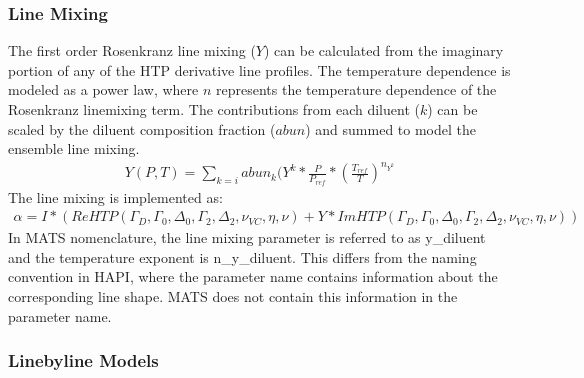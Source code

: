 \documentclass[letterpaper,10pt,english]{sphinxmanual}
\begin{document}
\subsubsection{Line Mixing}
\label{\detokenize{MATS Summary:line-mixing}}
\sphinxAtStartPar
The first order Rosenkranz line mixing (\(Y\)) can be calculated from the imaginary portion of any of the HTP derivative line profiles.  The temperature dependence is modeled as a power law, where \(n\) represents the temperature dependence of the Rosenkranz line\sphinxhyphen{}mixing term.  The contributions from each diluent (\(k\)) can be scaled by the diluent composition fraction (\(abun\)) and  summed to model the ensemble line mixing.
\begin{equation*}
\begin{split}Y(P,T) = \sum_{k = i} abun_{k} (Y^{k} * \frac{P}{P_{ref}} * (\frac{T_{ref}}{T})^{n_{Y^{k}}}\end{split}
\end{equation*}
\sphinxAtStartPar
The line mixing is implemented as:
\begin{equation*}
\begin{split}\alpha = I * (Re{HTP(\Gamma_{D}, \Gamma_{0}, \Delta_{0}, \Gamma_{2}, \Delta_{2}, \nu_{VC}, \eta, \nu)} + Y*Im{HTP(\Gamma_{D}, \Gamma_{0}, \Delta_{0}, \Gamma_{2}, \Delta_{2}, \nu_{VC}, \eta, \nu)})\end{split}
\end{equation*}
\sphinxAtStartPar
In MATS nomenclature, the line mixing parameter is referred to as y\_diluent and the temperature exponent is n\_y\_diluent.  This differs from the naming convention in HAPI, where the parameter name contains information about the corresponding line shape.  MATS does not contain this information in the parameter name.


\subsubsection{Line\sphinxhyphen{}by\sphinxhyphen{}line Models}
\label{\detokenize{MATS Summary:line-by-line-models}}
\end{document}
